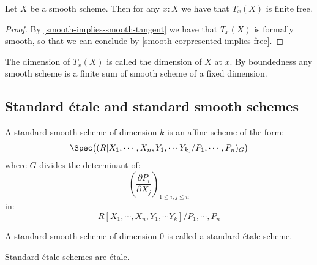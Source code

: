 \begin{proposition}\label{smooth-have-free-tangent}
Let $X$ be a smooth scheme. Then for any $x:X$ we have that $T_x(X)$ is finite free.
\end{proposition}

\begin{proof}
By \cref{smooth-implies-smooth-tangent} we have that $T_x(X)$ is formally smooth, so that we can conclude by \cref{smooth-corpresented-implies-free}.
\end{proof}

The dimension of $T_x(X)$ is called the dimension of $X$ at $x$. By boundedness any smooth scheme is a finite sum of smooth scheme of a fixed dimension.


\subsection{Standard étale and standard smooth schemes}

\begin{definition}
A standard smooth scheme of dimension $k$ is an affine scheme of the form:
\[\Spec\big((R[X_1,\cdots,X_n,Y_1,\cdots Y_{k}] / P_1,\cdots,P_n)_G\big)\]
where $G$ divides the determinant of:
\[\left( \frac{\partial P_i}{\partial X_j}\right)_{1\leq i,j\leq n}\]
in:
\[R[X_1,\cdots,X_n,Y_1,\cdots Y_{k}] / P_1,\cdots,P_n\]
\end{definition}

\begin{definition}
A standard smooth scheme of dimension $0$ is called a standard étale scheme.
\end{definition}

\begin{lemma}\label{standard-etale-are-etale}
Standard étale schemes are étale.
\end{lemma}

